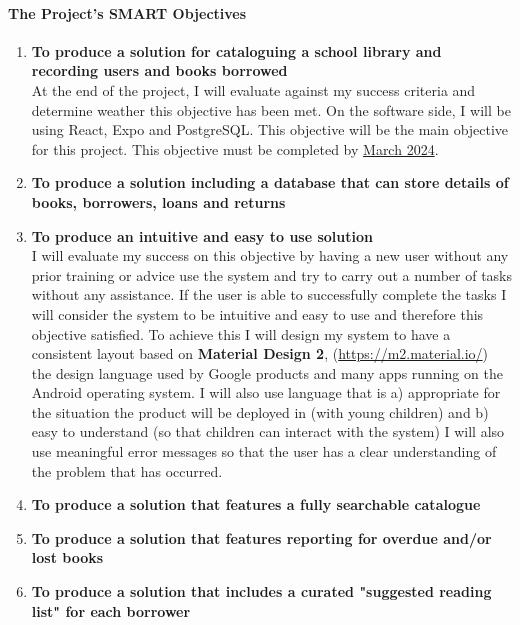 \documentclass{article}
\begin{document}
\paragraph{The Project's SMART Objectives}

\begin{enumerate}
    \item \textbf{To produce a solution for cataloguing a school library and recording users and books borrowed}\\
          At the end of the project, I will evaluate against my success criteria and determine weather this objective has been met.
          On the software side, I will be using React, Expo and PostgreSQL. This objective will be the main objective for this project.
          This objective must be completed by \underline{March 2024}.

    \item \textbf{To produce a solution including a database that can store details of books, borrowers, loans and returns}\\

    \item \textbf{To produce an intuitive and easy to use solution}\\
          I will evaluate my success on this objective by having a new user without any prior training or advice use the system and
          try to carry out a number of tasks without any assistance. If the user is able to successfully complete the tasks
          I will consider the system to be intuitive and easy to use and therefore this objective satisfied.
          To achieve this I will design my system to have a consistent layout based on \textbf{Material Design 2}, (\url{https://m2.material.io/})
          the design language used by Google products and many apps running on the Android operating system. I will also use language that is
          a) appropriate for the situation the product will be deployed in (with young children) and b) easy to understand (so that children can interact with the system)
          I will also use meaningful error messages so that the user has a clear understanding of the problem that has occurred.

    \item \textbf{To produce a solution that features a fully searchable catalogue}

    \item \textbf{To produce a solution that features reporting for overdue and/or lost books}
    \item \textbf{To produce a solution that includes a curated "suggested reading list" for each borrower}
\end{enumerate}
\end{document}

